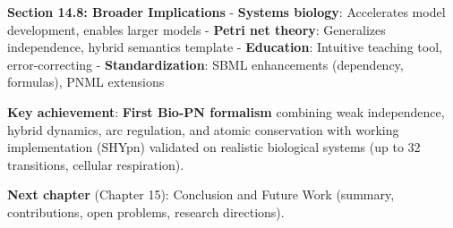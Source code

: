\textbf{Section 14.8: Broader Implications} - \textbf{Systems biology}:
Accelerates model development, enables larger models - \textbf{Petri net
theory}: Generalizes independence, hybrid semantics template -
\textbf{Education}: Intuitive teaching tool, error-correcting -
\textbf{Standardization}: SBML enhancements (dependency, formulas), PNML
extensions

\textbf{Key achievement}: \textbf{First Bio-PN formalism} combining weak
independence, hybrid dynamics, arc regulation, and atomic conservation
with working implementation (SHYpn) validated on realistic biological
systems (up to 32 transitions, cellular respiration).

\textbf{Next chapter} (Chapter 15): Conclusion and Future Work (summary,
contributions, open problems, research directions).
